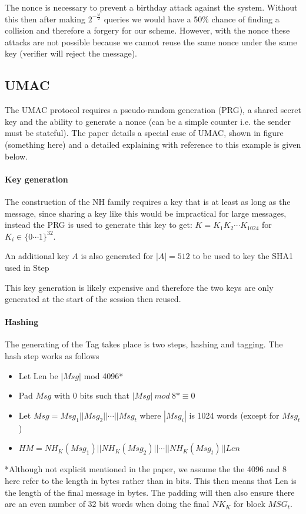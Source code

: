 \documentclass[10pt]{article} %
\begin{document}
The nonce is necessary to prevent a birthday attack against the system.
Without this then after making $2^{-\frac{w}{2}}$ queries we would have a 50\%
chance of finding a collision and therefore a forgery for our scheme. However,
with the nonce these attacks are not possible because we cannot reuse the same
nonce under the same key (verifier will reject the message).

\subsection{UMAC}

The UMAC protocol requires a pseudo-random generation (PRG), a shared secret
key and the ability to generate a nonce (can be a simple counter i.e. the
sender must be stateful). The paper details a special case of UMAC, shown in figure
(something here) and a detailed explaining with reference to this example is
given below.

\paragraph{Key generation}

The construction of the NH family requires a key that is at least as long as
the message, since sharing a key like this would be impractical for large
messages, instead the PRG is used to generate this key to get: $K =
K_1K_2\cdots K_{1024}$ for $K_i \in \{0 \cdots 1\}^{32}$.

An additional key $A$ is also generated for $|A|=512$ to be used to key the
SHA1 used in Step %

This key generation is likely expensive and therefore the two keys are only
generated at the start of the session then reused.

\paragraph{Hashing}
The generating of the Tag takes place is two steps, hashing and tagging. The
hash step works as follows
\begin{itemize}
\item Let Len be $|Msg|$ mod 4096*
\item Pad $Msg$ with 0 bits such that $|Msg|\ mod\ 8* \equiv 0$
\item Let $Msg=Msg_1||Msg_2||\cdots||Msg_t$ where $|Msg_i|$ is 1024 words (except
for $Msg_t$)
\item $HM = NH_K(Msg_1)||NH_K(Msg_2)||\cdots||NH_K(Msg_t)||Len$
\end{itemize}
*Although not explicit mentioned in the paper, we assume the the 4096 and 8
here refer to the length in bytes rather than in bits. This then means that Len
is the length of the final message in bytes. The padding will then also ensure
there are an even number of 32 bit words when doing the final $NK_K$ for block
$MSG_t$.
\end{document}
